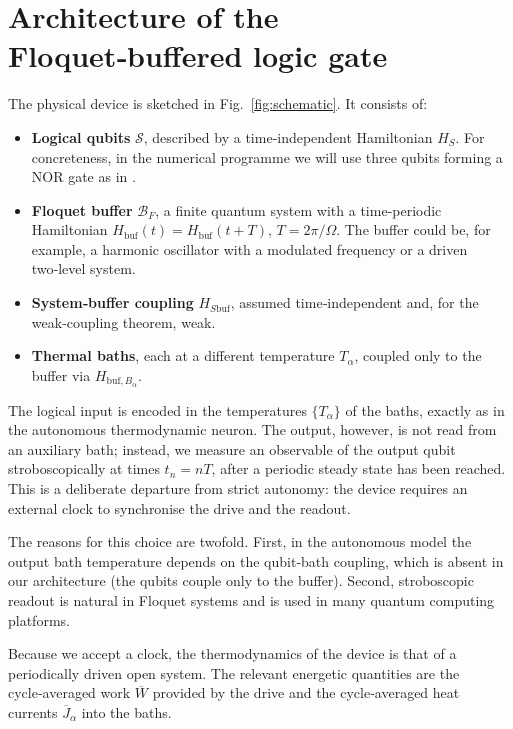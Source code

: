\documentclass[11pt,a4paper]{article}
\theoremstyle{definition}
\theoremstyle{remark}
\newcommand{\calS}{\mathcal{S}}
\newcommand{\calB}{\mathcal{B}}
\begin{document}
\section{Architecture of the Floquet‑buffered logic gate}\label{sec:architecture}
The physical device is sketched in Fig.~\ref{fig:schematic}. It consists of:
\begin{itemize}
    \item \textbf{Logical qubits} $\calS$, described by a time‑independent Hamiltonian $H_S$. For concreteness, in the numerical programme we will use three qubits forming a NOR gate as in \cite{LipkaBartosik2024}.
    \item \textbf{Floquet buffer} $\calB_F$, a finite quantum system with a time‑periodic Hamiltonian $H_{\text{buf}}(t)=H_{\text{buf}}(t+T)$, $T=2\pi/\Omega$. The buffer could be, for example, a harmonic oscillator with a modulated frequency or a driven two‑level system.
    \item \textbf{System‑buffer coupling} $H_{S\text{buf}}$, assumed time‑independent and, for the weak‑coupling theorem, weak.
    \item \textbf{Thermal baths}, each at a different temperature $T_\alpha$, coupled only to the buffer via $H_{\text{buf},B_\alpha}$.
\end{itemize}

The logical input is encoded in the temperatures $\{T_\alpha\}$ of the baths, exactly as in the autonomous thermodynamic neuron. The output, however, is not read from an auxiliary bath; instead, we measure an observable of the output qubit stroboscopically at times $t_n=nT$, after a periodic steady state has been reached. This is a deliberate departure from strict autonomy: the device requires an external clock to synchronise the drive and the readout.

The reasons for this choice are twofold. First, in the autonomous model the output bath temperature depends on the qubit‑bath coupling, which is absent in our architecture (the qubits couple only to the buffer). Second, stroboscopic readout is natural in Floquet systems and is used in many quantum computing platforms.

Because we accept a clock, the thermodynamics of the device is that of a periodically driven open system. The relevant energetic quantities are the cycle‑averaged work $\overline{W}$ provided by the drive and the cycle‑averaged heat currents $\overline{J}_\alpha$ into the baths.
\end{document}
